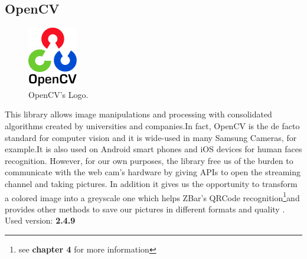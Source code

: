 \subsection{OpenCV}
\begin{figure}[hbt]
    \centering
    \includegraphics[scale=0.5]{img/opencv.png}
    \caption{OpenCV's Logo.}
\end{figure}
This library allows image manipulations and processing with consolidated algorithms created by universities and companies.In fact, OpenCV is the de facto standard for computer vision and it is wide-used in many Samsung Cameras, for example.It is also used on Android smart phones and iOS devices for human faces recognition. However, for our own purposes, the library free us of the burden to communicate with the web cam's hardware by giving APIs to open the streaming channel and taking pictures. In addition it gives us the opportunity to transform a colored image into a greyscale one which helps ZBar's QRCode recognition\footnote{see \textbf{chapter 4} for more information}and provides other methods to save our pictures in different formats and quality . 
\newline Used version: \textbf{2.4.9}

